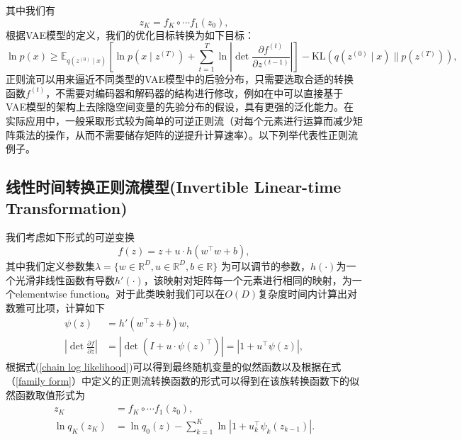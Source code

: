 其中我们有
\begin{equation}
    z_{K}=f_{K}\circ \cdots f_1(z_0),
    \label{z_K definition}
\end{equation}
根据VAE模型的定义，我们的优化目标转换为如下目标：
\begin{equation}
    \ln p({x}) \geq \mathbb{E}_{q\left({z}^{(0)} \mid {x}\right)}\left[\ln p\left({x} \mid {z}^{(T)}\right)+\sum_{t=1}^T \ln \left|\operatorname{det} \frac{\partial {f}^{(t)}}{\partial {z}^{(t-1)}}\right|\right]-\mathrm{KL}\left(q\left({z}^{(0)} \mid {x}\right) \| p\left({z}^{(T)}\right)\right),
    \label{NF objective}
    \end{equation}
正则流可以用来逼近不同类型的VAE模型中的后验分布，只需要选取合适的转换函数$f^{(t)}$，不需要对编码器和解码器的结构进行修改，例如在\cite{papamakarios2021normalizing}中可以直接基于VAE模型的架构上去除隐空间变量的先验分布的假设，具有更强的泛化能力。在实际应用中，一般采取形式较为简单的可逆正则流（对每个元素进行运算而减少矩阵乘法的操作，从而不需要储存矩阵的逆提升计算速率）。以下列举代表性正则流例子。
\subsection{线性时间转换正则流模型(Invertible Linear-time Transformation)}
我们考虑如下形式的可逆变换
\begin{equation}
    f(z) = z+ u\cdot h(w^{\top } w + b),
    \label{family form}
\end{equation}
其中我们定义参数集$\lambda = \{w\in \mathbb{R}^{D}, u\in \mathbb{R}^D,b\in \mathbb{R}\}$ 为可以调节的参数，$h(\cdot)$为一个光滑非线性函数有导数$h'(\cdot)$，该映射对矩阵每一个元素进行相同的映射，为一个elementwise function。对于此类映射我们可以在$O(D)$复杂度时间内计算出对数雅可比项，计算如下
\begin{align}
    \psi(z) &= h'(w^{\top}z+b)w,\\
    |\operatorname{det}\frac{\partial f}{\partial z}| &= |\operatorname{det}(I+u\cdot \psi(z)^{\top})|=|1+u^{\top}\psi(z)|,
\end{align}
根据式(\ref{chain log likelihood})可以得到最终随机变量的似然函数以及根据在式（\ref{family form}）中定义的正则流转换函数的形式可以得到在该族转换函数下的似然函数取值形式为
\begin{align}
     z_{K} &=f_{K}\circ \cdots f_1(z_0), \\
     \ln q_{K}(z_{K})&= \ln q_0(z)-\sum_{k=1}^{K}\ln |1+u_{k}^{\top}\psi_{k}(z_{k-1})|.
\end{align}

